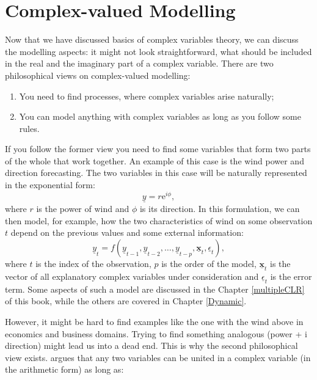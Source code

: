 \documentclass[
]{book}
\providecommand{\tightlist}{%
  \setlength{\itemsep}{0pt}\setlength{\parskip}{0pt}}
\begin{document}
\hypertarget{complex-valued-modelling}{%
\section{Complex-valued Modelling}\label{complex-valued-modelling}}

Now that we have discussed basics of complex variables theory, we can discuss the modelling aspects: it might not look straightforward, what should be included in the real and the imaginary part of a complex variable. There are two philosophical views on complex-valued modelling:

\begin{enumerate}
\def\labelenumi{\arabic{enumi}.}
\tightlist
\item
  You need to find processes, where complex variables arise naturally;
\item
  You can model anything with complex variables as long as you follow some rules.
\end{enumerate}

If you follow the former view you need to find some variables that form two parts of the whole that work together. An example of this case is the wind power and direction forecasting. The two variables in this case will be naturally represented in the exponential form:
\begin{equation*}
    \underline{y} = r \mathrm{e}^{i \phi} ,
\end{equation*}
where \(r\) is the power of wind and \(\phi\) is its direction. In this formulation, we can then model, for example, how the two characteristics of wind on some observation \(t\) depend on the previous values and some external information:
\begin{equation*}
    \underline{y}_t = f(\underline{y}_{t-1}, \underline{y}_{t-2}, \dots, \underline{y}_{t-p}, \underline{\mathbf{x}}_t, \underline{\epsilon}_t),
\end{equation*}
where \(t\) is the index of the observation, \(p\) is the order of the model, \(\underline{\mathbf{x}}_t\) is the vector of all explanatory complex variables under consideration and \(\underline{\epsilon}_t\) is the error term. Some aspects of such a model are discussed in the Chapter \ref{multipleCLR} of this book, while the others are covered in Chapter \ref{Dynamic}.

However, it might be hard to find examples like the one with the wind above in economics and business domains. Trying to find something analogous (power + i direction) might lead us into a dead end. This is why the second philosophical view exists. \citet{Svetunkov2012} argues that any two variables can be united in a complex variable (in the arithmetic form) as long as:
\end{document}
